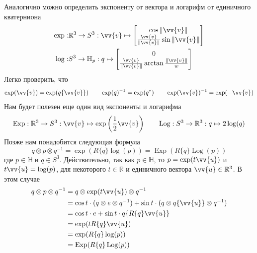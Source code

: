 \documentclass[12pt]{article}
\begin{document}
Аналогично можно определить экспоненту от вектора и логарифм от единичного кватерниона
\begin{equation}
    \begin{aligned}
        \exp: & \mathbb{R}^3\to S^3:
        \vv{v}\mapsto
        \begin{bmatrix}
            \cos \Vert \vv{v}\Vert \\
            \frac{\vv{v}}{\Vert \vv{v}\Vert}\sin\Vert \vv{v}\Vert
        \end{bmatrix}
        \\
        \log: & S^3\to\mathbb{H}_p:q\mapsto\begin{bmatrix}
            0 \\
            \frac{\vv{v}}{\Vert\vv{v}\Vert}\arctan\frac{\Vert\vv{v}\Vert}{w}
        \end{bmatrix}
    \end{aligned}
\end{equation}
Легко проверить, что
\begin{equation}
    \exp(\vv{v})=\exp(q\{\vv{v}\})
    \qquad
    \exp(q)^{-1}=\exp(q^*)
    \qquad
    \exp(\vv{v})^{-1}=\exp(-\vv{v})
\end{equation}
Нам будет полезен еще один вид экспоненты и логарифма
\begin{equation}
    \operatorname{Exp}:\mathbb{R}^3\to S^3:
    \vv{v}\mapsto\exp\left(\frac{1}{2}\vv{v}\right)
    \qquad
    \operatorname{Log}:S^3\to\mathbb{R}^3:
    q\mapsto 2\log(q)
\end{equation}
Позже нам понадобится следующая формула
\begin{equation}
    q\otimes p \otimes q^{-1}=\exp(R\{q\}\log(p))=\operatorname{Exp}(R\{q\}\operatorname{Log}(p))
\end{equation}
где $p\in\mathbb{H}$ и $q\in S^3$. Действительно, так как $p\in \mathbb{H}$, то
$p=\exp(t \vv{u})$ и $t \vv{u}=\log(p)$, для
некоторого $t\in\mathbb{R}$ и единичного вектора $\vv{u}\in\mathbb{R}^3$. В этом
случае
\begin{equation}
    \begin{aligned}
        q\otimes p \otimes q^{-1}
         & =q\otimes \exp(t \vv{u}) \otimes q^{-1}            \\
         & =\cos t \cdot (q\otimes e \otimes q^{-1})
        + \sin t \cdot (q\otimes  q\{\vv{u}\} \otimes q^{-1}) \\
         & =\cos t \cdot e + \sin t \cdot q\{R\{q\}\vv{u}\}   \\
         & =\exp(t R\{q\} \vv{u})                             \\
         & =\exp(R\{q\} \log(p))                              \\
         & =\operatorname{Exp}(R\{q\} \operatorname{Log}(p))  \\
    \end{aligned}
\end{equation}
\end{document}
